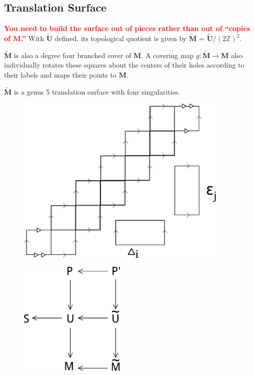 \documentclass[]{article}
\newcommand{\compat}[1]{\textbf{\textcolor{red}{#1}}}
\begin{document}
\newpage
\subsection{Translation Surface}
\compat{You need to build the surface out of pieces rather than out of ``copies of $\mathbf{M}$.''} 
With $\tilde{\mathbf{U}}$ defined, its topological quotient is given by $\tilde{\mathbf{M}}$ = $\tilde{\mathbf{U}}/(2\mathbb{Z})^{2}$.

\begin{figure}[H]
\centering

\end{figure}
$\tilde{\mathbf{M}}$ is also a degree four branched cover of $\mathbf{M}$. A covering map $g:\tilde{\mathbf{M}} \rightarrow \mathbf{M}$ also individually rotates these squares about the centers of their holes according to their labels and maps their points to $\mathbf{M}$.

$\tilde{\mathbf{M}}$ is a genus 5 translation surface with four singularities. 

\begin{figure}[H]
\centering

\end{figure}

\begin{figure}[H]
\centering
\includegraphics[width=4in]{cylinderdecomp.pdf}
\end{figure}

\begin{figure}[H]
\centering

\end{figure}

\begin{figure}[H]
\centering

\end{figure}

\begin{figure}[H]
\centering
\includegraphics[width=2in]{commute.pdf}
\end{figure}
\end{document}
